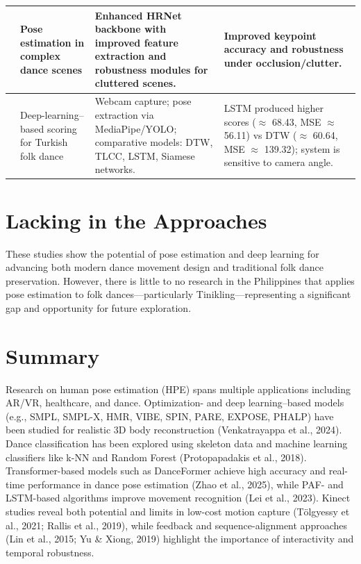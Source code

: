 \begin{longtable}{|p{2.5cm}|p{2.5cm}|p{2.5cm}|p{2.5cm}|}
\emph{\citet{sun2025dancemovement}} & Pose estimation in complex dance scenes & Enhanced HRNet backbone with improved feature extraction and robustness modules for cluttered scenes. & Improved keypoint accuracy and robustness under occlusion/clutter. \\ \hline

\emph{\citet{Erdem2025}} & Deep-learning--based scoring for Turkish folk dance & Webcam capture; pose extraction via MediaPipe/YOLO; comparative models: DTW, TLCC, LSTM, Siamese networks. & LSTM produced higher scores ($\approx$ 68.43, MSE $\approx$ 56.11) vs DTW ($\approx$ 60.64, MSE $\approx$ 139.32); system is sensitive to camera angle. \\ \hline

\end{longtable}


\section{Lacking in the Approaches}

These studies show the potential of pose estimation and deep learning for advancing both modern dance movement design and traditional folk dance preservation. However, there is little to no research in the Philippines that applies pose estimation to folk dances—particularly Tinikling—representing a significant gap and opportunity for future exploration. 




\section{Summary}

Research on human pose estimation (HPE) spans multiple applications including AR/VR, healthcare, and dance. Optimization- and deep learning–based models (e.g., SMPL, SMPL-X, HMR, VIBE, SPIN, PARE, EXPOSE, PHALP) have been studied for realistic 3D body reconstruction (Venkatrayappa et al., 2024). Dance classification has been explored using skeleton data and machine learning classifiers like k-NN and Random Forest (Protopapadakis et al., 2018). Transformer-based models such as DanceFormer achieve high accuracy and real-time performance in dance pose estimation (Zhao et al., 2025), while PAF- and LSTM-based algorithms improve movement recognition (Lei et al., 2023). Kinect studies reveal both potential and limits in low-cost motion capture (Tölgyessy et al., 2021; Rallis et al., 2019), while feedback and sequence-alignment approaches (Lin et al., 2015; Yu \& Xiong, 2019) highlight the importance of interactivity and temporal robustness.

